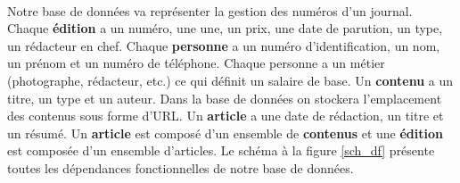 \paragraph{}{
    Notre base de données va représenter la gestion des numéros d'un journal. Chaque \textbf{édition} a un numéro, une une, un prix, une date de parution, un type, un rédacteur en chef. Chaque \textbf{personne} a un numéro d'identification, un nom, un prénom et un numéro de téléphone. Chaque personne a un métier (photographe, rédacteur, etc.) ce qui définit un salaire de base. Un \textbf{contenu} a un titre, un type et un auteur. Dans la base de données on stockera l'emplacement des contenus sous forme d'URL. Un \textbf{article} a une date de rédaction, un titre et un résumé. Un \textbf{article} est composé d'un ensemble de \textbf{contenus} et une \textbf{édition} est composée d'un ensemble d'articles. \newline
    Le schéma à la figure \ref{sch_df} présente toutes les dépendances fonctionnelles de notre base de données.
}
